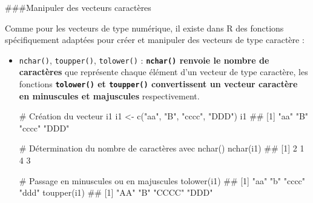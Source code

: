 \documentclass[12pt,twosided, notitlepage]{book}
\newenvironment{Shaded}{}{}
\newcommand{\CommentTok}[1]{\textcolor[rgb]{0.00,0.50,0.00}{#1}}
\newcommand{\KeywordTok}[1]{\textcolor[rgb]{0.00,0.00,1.00}{#1}}
\newcommand{\NormalTok}[1]{#1}
\newcommand{\StringTok}[1]{\textcolor[rgb]{0.00,0.50,0.50}{#1}}
\renewenvironment{Shaded}{\begin{snugshade}}{\end{snugshade}}
\begin{document}
\#\#\#Manipuler des vecteurs caractères

Comme pour les vecteurs de type numérique, il existe dans R des
fonctions spécifiquement adaptées pour créer et manipuler des vecteurs
de type caractère :

\begin{itemize}
\item
  \texttt{nchar()},
  \texttt{toupper()},
  \texttt{tolower()} :
  \textbf{\texttt{nchar()} renvoie le nombre de caractères} que
  représente chaque élément d'un vecteur de type caractère, les
  fonctions \textbf{\texttt{tolower()} et \texttt{toupper()}
  convertissent un vecteur caractère en minuscules et majuscules}
  respectivement.

\begin{Shaded}
\begin{Highlighting}[]
\CommentTok{# Création du vecteur i1}
\NormalTok{i1 <-}\StringTok{ }\KeywordTok{c}\NormalTok{(}\StringTok{"aa"}\NormalTok{, }\StringTok{"B"}\NormalTok{, }\StringTok{"cccc"}\NormalTok{, }\StringTok{"DDD"}\NormalTok{)}
\NormalTok{i1}
\NormalTok{  ## [1] "aa"   "B"    "cccc" "DDD"}

\CommentTok{# Détermination du nombre de caractères avec nchar()}
\KeywordTok{nchar}\NormalTok{(i1)}
\NormalTok{  ## [1] 2 1 4 3}

\CommentTok{# Passage en minuscules ou en majuscules}
\KeywordTok{tolower}\NormalTok{(i1)}
\NormalTok{  ## [1] "aa"   "b"    "cccc" "ddd"}
\KeywordTok{toupper}\NormalTok{(i1)}
\NormalTok{  ## [1] "AA"   "B"    "CCCC" "DDD"}
\end{Highlighting}
\end{Shaded}
\end{itemize}

~
\end{document}
